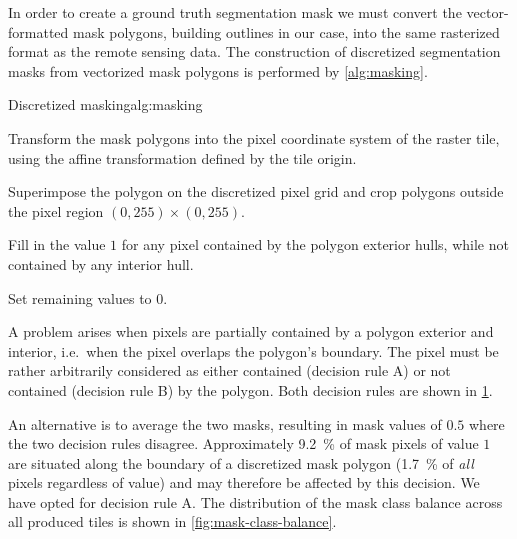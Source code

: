 In order to create a ground truth segmentation mask we must convert the vector-formatted mask polygons, building outlines in our case, into the same rasterized format as the remote sensing data.
The construction of discretized segmentation masks from vectorized mask polygons is performed by \cref{alg:masking}.

\begin{algorithm}{Discretized masking}{alg:masking}
  \item Transform the mask polygons into the pixel coordinate system of the raster tile, using the affine transformation defined by the tile origin.
  \item Superimpose the polygon on the discretized pixel grid and crop polygons outside the pixel region $(0, 255) \times (0, 255)$.
  \item Fill in the value $1$ for any pixel contained by the polygon exterior hulls, while not contained by any interior hull.
  \item Set remaining values to $0$.
\end{algorithm}

A problem arises when pixels are partially contained by a polygon exterior and interior, i.e.\ when the pixel overlaps the polygon's boundary.
The pixel must be rather arbitrarily considered as either contained (decision rule A) or not contained (decision rule B) by the polygon.
Both decision rules are shown in \cref{fig:pixel-containment}.

\begin{figure}[H]
  \centering
  
  \hspace{2em}
  
  \label{fig:pixel-containment}
\end{figure}

An alternative is to average the two masks, resulting in mask values of $0.5$ where the two decision rules disagree.
Approximately \SI{9.2}{\percent} of mask pixels of value $1$ are situated along the boundary of a discretized mask polygon (\SI{1.7}{\percent} of \textit{all} pixels regardless of value) and may therefore be affected by this decision.
We have opted for decision rule A.
The distribution of the mask class balance across all produced tiles is shown in \cref{fig:mask-class-balance}.


